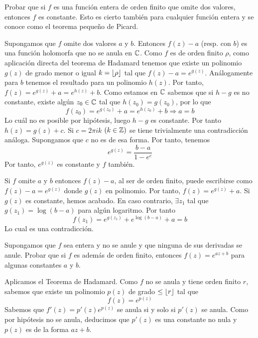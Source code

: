 \documentclass[twoside]{article}
\begin{document}
\newpage

\begin{ejercicio}{4}
Probar que si $f$ es una función entera de orden finito que omite dos valores, entonces $f$ es constante. Esto es cierto también para cualquier función entera y se conoce como el teorema pequeño de Picard.
\end{ejercicio}
\begin{solucion}
Supongamos que $f$ omite dos valores $a$ y $b$. Entonces $f(z)-a$ (resp. con $b$) es una función holomorfa que no se anula en $\mathbb{C}$. Como $f$ es de orden finito $\rho$, como aplicación directa del teorema de Hadamard tenemos que existe un polinomio $g(z)$ de grado menor o igual $k=\left\lfloor{\rho}\right\rfloor$ tal que $f(z)-a=e^{g(z)}$. Análogamente para $b$ tenemos el resultado para un polinomio $h(z)$. Por tanto, $f(z)=e^{g(z)}+a=e^{h(z)}+b$. Como estamos en $\mathbb{C}$ sabemos que si $h-g$ es no constante, existe algún $z_0\in \mathbb{C}$ tal que $h(z_0)=g(z_0)$, por lo que 
$$
f(z_0) = e^{g(z_0)}+a=e^{h(z_0)}+b \Rightarrow a = b
$$
Lo cuál no es posible por hipótesis, luego $h-g$ es constante. Por tanto $h(z)=g(z)+c$. Si $c=2\pi i k$ $(k\in \mathbb{Z})$ se tiene trivialmente una contradicción análoga. Supongamos que $c$ no es de esa forma. Por tanto, tenemos
$$
e^{g(z)}=\frac{b-a}{1-e^c}
$$
Por tanto, $e^{g(z)}$ es constante y $f$ también. 

\end{solucion}
\begin{solucion}
Si $f$ omite $a$ y $b$ entonces $f(z)-a$, al ser de orden finito, puede escribirse como $f(z)-a = e^{g(z)}$ donde $g(z)$ en polinomio. Por tanto, $f(z)=e^{g(z)}+a$. Si $g(z)$ es constante, hemos acabado. En caso contrario, $\exists z_1$ tal que $g(z_1) = \log (b-a)$ para algún logaritmo. Por tanto
$$
f(z_1) = e^{g(z_1)}+e^{\log(b-a)}+a = b
$$
Lo cual es una contradicción.
\end{solucion}
\newpage


\begin{ejercicio}{5}
Supongamos que $f$ sea entera y no se anule y que ninguna de sus derivadas se anule. Probar que si $f$ es además de orden finito, entonces $f(z)=e^{az+b}$ para algunas constantes $a$ y $b$.
\end{ejercicio}
\begin{solucion}
Aplicamos el Teorema de Hadamard. Como $f$ no se anula y tiene orden finito $r$, sabemos que existe un polinomio $p(z)$ de grado $\leq \left\lfloor{r}\right\rfloor$ tal que
$$
f(z)=e^{p(z)}
$$
Sabemos que $f'(z)=p'(z)e^{p(z)}$ se anula si y solo si $p'(z)$ se anula. Como por hipótesis no se anula, deducimos que $p'(z)$ es una constante no nula y $p(z)$ es de la forma $az+b$.
\end{solucion}
\newpage
\end{document}
